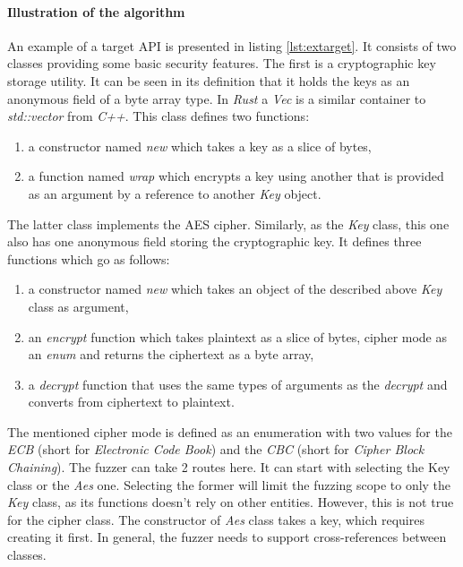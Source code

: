 \paragraph{Illustration of the algorithm}
An example of a target API is presented in listing \ref{lst:extarget}. It consists of two classes providing some basic security features. The first is a cryptographic key storage utility. It can be seen in its definition that it holds the keys as an anonymous field of a byte array type. In \textit{Rust} a \textit{Vec} is a similar container to \textit{std::vector} from \textit{C++}. This class defines two functions:
\begin{enumerate}
    \item a constructor named \textit{new} which takes a key as a slice of bytes,
    \item a function named \textit{wrap} which encrypts a key using another that is provided as an argument by a reference to another \textit{Key} object.
\end{enumerate}
The latter class implements the AES cipher. Similarly, as the \textit{Key} class, this one also has one anonymous field storing the cryptographic key. It defines three functions which go as follows:
\begin{enumerate}
    \item a constructor named \textit{new} which takes an object of the described above \textit{Key} class as argument,
    \item an \textit{encrypt} function which takes plaintext as a slice of bytes, cipher mode as an \textit{enum} and returns the ciphertext as a byte array,
    \item a \textit{decrypt} function that uses the same types of arguments as the \textit{decrypt} and converts from ciphertext to plaintext.
\end{enumerate}
The mentioned cipher mode is defined as an enumeration with two values for the \textit{ECB} (short for \textit{Electronic Code Book}) and the \textit{CBC} (short for \textit{Cipher Block Chaining}). The fuzzer can take 2 routes here. It can start with selecting the Key class or the \textit{Aes} one. Selecting the former will limit the fuzzing scope to only the \textit{Key} class, as its functions doesn't rely on other entities. However, this is not true for the cipher class. The constructor of \textit{Aes} class takes a key, which requires creating it first. In general, the fuzzer needs to support cross-references between classes.

